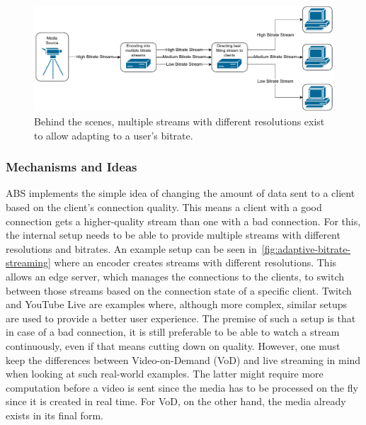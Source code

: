 \vspace{0.5cm}
\begin{figure}[H]
    \centering
    \includegraphics[width=\textwidth]{figures/02_background/adaptive-bitrate-streaming.drawio.pdf}
    \caption[Adaptive streaming schematic]{Behind the scenes, multiple streams with different
    resolutions exist to allow adapting to a user's bitrate.}\label{fig:adaptive-bitrate-streaming}
\end{figure}
\vspace{1cm}

\subsubsection{Mechanisms and Ideas}
ABS implements the simple idea of changing the amount of data sent to a client 
based on the client's connection quality.
This means a client with a good connection gets a higher-quality stream than 
one with a bad connection.
For this, the internal setup needs to be able to provide multiple streams with
different resolutions and bitrates.
An example setup can be seen in~\autoref{fig:adaptive-bitrate-streaming} where
an encoder creates streams with different resolutions.
This allows an edge server, which manages the connections to the clients, 
to switch between those streams based on the connection state of a specific client.
Twitch and YouTube Live are examples where, although more complex, similar setups
are used to provide a better user experience.
The premise of such a setup is that in case of a bad connection, it is still 
preferable to be able to watch a stream continuously, even if that means
cutting down on quality.
However, one must keep 
the differences between Video-on-Demand (VoD) and live streaming in mind when looking at such real-world examples.
The latter might require more computation before a video is sent since the media 
has to be processed on the fly since it is created in real time.
For VoD, on the other hand, the media already exists in its final form. 

